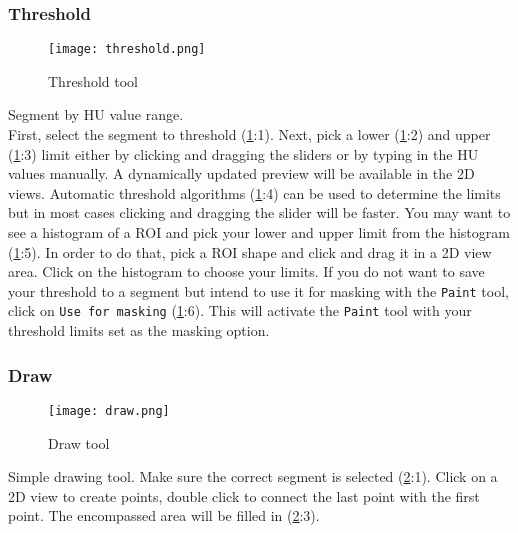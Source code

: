 
\subsubsection{Threshold}\label{section:threshold}
\begin{figure}[h]
	\begin{subfigure}{0.2\textwidth}
		
	\end{subfigure}
\end{figure}


\begin{figure}[h!]
	\centerline{
		\texttt{[image: threshold.png]}}
	\caption{Threshold tool}\label{fig:threshold}
\end{figure}
\noindent
Segment by HU value range.\\
First, select the segment to threshold (\cref{fig:threshold}:1).
Next, pick a lower (\cref{fig:threshold}:2) and upper (\cref{fig:threshold}:3) limit either by clicking and dragging the sliders or by typing in the HU values manually.
A dynamically updated preview will be available in the 2D views.
Automatic threshold algorithms (\cref{fig:threshold}:4) can be used to determine the limits but in most cases clicking and dragging the slider will be faster.
You may want to see a histogram of a ROI and pick your lower and upper limit from the histogram (\cref{fig:threshold}:5).
In order to do that, pick a ROI shape and click and drag it in a 2D view area.
Click on the histogram to choose your limits.
If you do not want to save your threshold to a segment but intend to use it for masking with the \texttt{Paint} tool, click on \texttt{Use for masking} (\cref{fig:threshold}:6).
This will activate the \texttt{Paint} tool with your threshold limits set as the masking option.

\pagebreak
\subsubsection{Draw}\label{section:draw}
\begin{figure}[h]
	\begin{subfigure}{0.2\textwidth}
		
	\end{subfigure}
\end{figure}


\begin{figure}[h!]
	\centerline{
		\texttt{[image: draw.png]}}
	\caption{Draw tool}\label{fig:draw}
\end{figure}
\noindent
Simple drawing tool.
Make sure the correct segment is selected (\cref{fig:draw}:1).
Click on a 2D view to create points, double click to connect the last point with the first point.
The encompassed area will be filled in (\cref{fig:draw}:3).

